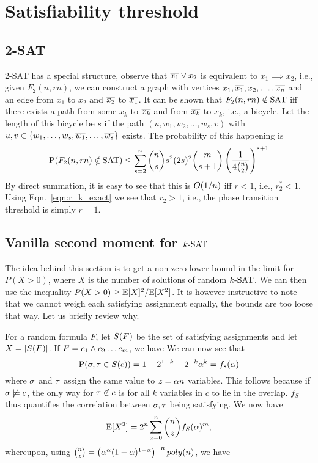 \documentclass[letterpaper, 10pt, twocolumn, reqno]{amsart}
\begin{document}
\section{Satisfiability threshold}
\label{sec:sat_thresh}


\subsection{2-SAT}
\label{ssec:2sat}
2-SAT has a special structure, observe that $\n{x_1} \oor x_2$ is equivalent to $x_1 \implies x_2$, i.e., given $F_2(n, rn)$, we can construct a graph with
vertices $x_1, \n{x_1}, x_2, \ldots, \n{x_n}$ and an edge from $x_1$ to $x_2$ and $\n{x_2}$ to $\n{x_1}$. It can be shown that $F_2(n,rn) \notin \SAT$ iff
there exists a path from some $x_k$ to $\n{x_k}$ and from $\n{x_k}$ to $x_k$, i.e., a bicycle. Let the length of this bicycle be $s$ if the path $(u, w_1, w_2
, \ldots, w_s, v)$ with $u,v \in \{w_1, \ldots, w_s,\n{w_1}, \ldots, \n{w_s}\}$
 exists. The probability of this happening is
$$
\P(F_2(n,rn) \notin \SAT) \leq \sum_{s=2}^n {n \choose s} s^2 (2s)^2 {m \choose s+1} \rbrac{\f{1}{4 {n \choose 2}}}^{s+1}
$$
By direct summation, it is easy to see that this is $\bigo(1/n)$ iff $r <1$, i.e., $r_2^* < 1$. Using Eqn.~\eqref{eqn:r_k_exact} we see that $r_2 > 1$, i.e., the phase transition threshold is simply $r = 1$.

\subsection{Vanilla second moment for $\ksat$}
\label{ssec:ksat_vanilla}
The idea behind this section is to get a non-zero lower bound in the limit for $P(X > 0)$, where $X$ is the number of solutions of random $\ksat$. We can then use the inequality $P(X>0) \geq \E[X]^2/\E[X^2]$. It is however instructive to note that we cannot weigh each satisfying assignment equally, the bounds are too loose that way. Let us briefly review why.

For a random formula $F$, let $\sf$ be the set of satisfying assignments and let $X = \abs{\sf}$. If $F = c_1 \aand c_2 \ldots c_m$, we have
We can now see that
$$
\P(\s,\t \in \sc) = 1 -2^{1-k} - 2^{-k}\a^k = f_s(\a)
$$
where $\s$ and $\t$ assign the same value to $z = \a n$ variables. This follows because if $\s \not\sat c$, the only way for $\t \not\in c$ is for all $k$ variables in $c$ to lie in the overlap. $f_S$ thus quantifies the correlation between $\s,\t$ being satisfying. We now have
$$
\E[X^2] = 2^n \sum_{z=0}^n {n \choose z} f_S(\a)^m,
$$
whereupon, using ${n \choose z} = \rbrac{\a^\a (1-\a)^{1-\a}}^{-n} poly(n)$, we have
\end{document}
